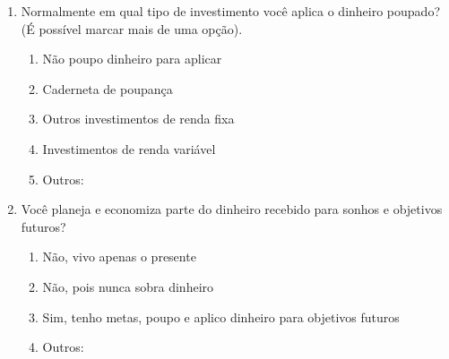\begin{enumerate}
    \item Normalmente em qual tipo de investimento você aplica o dinheiro poupado? (É possível marcar mais de uma opção).
        \begin{enumerate}
            \item Não poupo dinheiro para aplicar
            \item Caderneta de poupança
            \item Outros investimentos de renda fixa
            \item Investimentos de renda variável
            \item Outros:
        \end{enumerate}
        
    \item Você planeja e economiza parte do dinheiro recebido para sonhos e objetivos futuros?
        \begin{enumerate}
            \item Não, vivo apenas o presente
            \item Não, pois nunca sobra dinheiro
            \item Sim, tenho metas, poupo e aplico dinheiro para objetivos futuros
            \item Outros:
        \end{enumerate}
\end{enumerate}